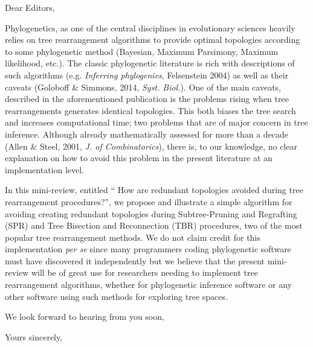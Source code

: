 \documentclass[11pt]{letter}
\begin{document}
\begin{letter}{}
\opening{Dear Editors,}

Phylogenetics, as one of the central disciplines in evolutionary sciences heavily relies on tree rearrangement algorithms to provide optimal topologies according to some phylogenetic method (Bayesian, Maximum Parsimony, Maximum likelihood, etc.).
The classic phylogenetic literature is rich with descriptions of such algorithms (e.g. \textit{Inferring phylogenies}, Felsenstein 2004) as well as their caveats (Goloboff \& Simmons, 2014, \textit{Syst. Biol.}).
One of the main caveats, described in the aforementioned publication is the problems rising when tree rearrangements generates identical topologies.
This both biases the tree search and increases computational time; two problems that are of major concern in tree inference. 
Although already mathematically assessed for more than a decade (Allen \& Steel, 2001, \textit{J. of Combinatorics}), there is, to our knowledge, no clear explanation on how to avoid this problem in the present literature at an implementation level.

In this mini-review, entitled `` How are redundant topologies avoided during tree rearrangement procedures?'', we propose and illustrate a simple algorithm for avoiding creating redundant topologies during Subtree-Pruning and Regrafting (SPR) and Tree Bisection and Reconnection (TBR) procedures, two of the most popular tree rearrangement methods.
We do not claim credit for this implementation \textit{per se} since many programmers coding phylogenetic software must have discovered it independently but we believe that the present mini-review will be of great use for researchers needing to implement tree rearrangement algorithms, whether for phylogenetic inference software or any other software using such methods for exploring tree spaces.

We look forward to hearing from you soon,

\closing{Yours sincerely,}

\end{letter}
\end{document}
